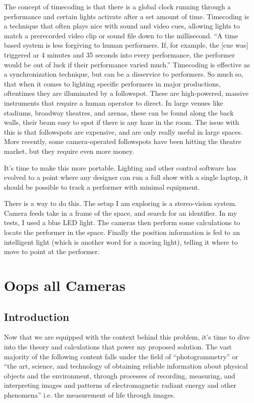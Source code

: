 \documentclass[12pt,twoside]{reedthesis}
\begin{document}
	The concept of timecoding is that there is a global clock running through a performance and certain lights activate after a set amount of time. Timecoding is a technique that often plays nice with sound and video cues, allowing lights to match a prerecorded video clip or sound file down to the millisecond. “A time based system is less forgiving to human performers. If, for example, the [cue was] triggered ar 4 minutes and 35 seconds into every performance, the performer would be out of luck if their performance varied much.” Timecoding is effective as a synchronization technique, but can be a disservice to performers. So much so, that when it comes to lighting specific performers in major productions, oftentimes they are illuminated by a followspot. These are high-powered, massive instruments that require a human operator to direct. In large venues like stadiums, broadway theatres, and arenas, these can be found along the back walls, their beam easy to spot if there is any haze in the room. The issue with this is that followspots are expensive, and are only really useful in large spaces. More recently, some camera-operated followspots have been hitting the theatre market, but they require even more money.
	
	It’s time to make this more portable. Lighting and other control software has evolved to a point where any designer can run a full show with a single laptop, it should be possible to track a performer with minimal equipment.
	
	There is a way to do this. The setup I am exploring is a stereo-vision system. Camera feeds take in a frame of the space, and search for an identifier. In my tests, I used a blue LED light. The cameras then perform some calculations to locate the performer in the space. Finally the position information is fed to an intelligent light (which is another word for a moving light), telling it where to move to point at the performer.



\chapter{Oops all Cameras}	
\section{Introduction}
	Now that we are equipped with the context behind this problem, it’s time to dive into the theory and calculations that power my proposed solution. The vast majority of the following content falls under the field of “photogrammetry” or “the art, science, and technology of obtaining reliable information about physical objects and the environment, through processes of recording, measuring, and interpreting images and patterns of electromagnetic radiant energy and other phenomena” i.e. the measurement of life through images.
\end{document}
